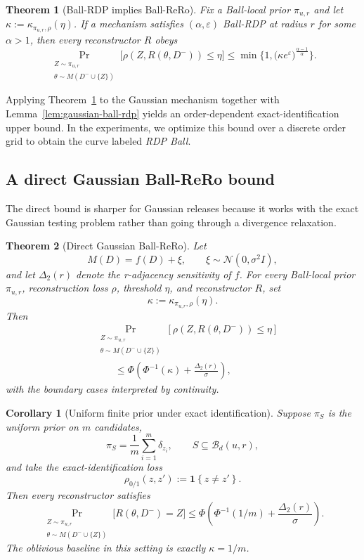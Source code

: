 \documentclass[conference,compsoc]{IEEEtran}
\newtheorem{theorem}{Theorem}
\newtheorem{corollary}{Corollary}
\newcommand{\ind}[1]{\mathbf{1}\!\left\{#1\right\}}
\newcommand{\ball}[2]{\mathcal{B}_{#1}(#2)}
\begin{document}
\begin{theorem}[Ball-RDP implies Ball-ReRo]
\label{thm:ball-rdp-rero}
Fix a Ball-local prior $\pi_{u,r}$ and let $\kappa:=\kappa_{\pi_{u,r},\rho}(\eta)$. If a mechanism satisfies $(\alpha,\varepsilon)$ Ball-RDP at radius $r$ for some $\alpha>1$, then every reconstructor $R$ obeys
\[
\Pr_{\substack{Z\sim\pi_{u,r}\\
\theta\sim M(D^-\cup\{Z\})}}
\big[\rho(Z,R(\theta,D^-))\le \eta\big]
\le
\min\Big\{1,\big(\kappa e^{\varepsilon}\big)^{\frac{\alpha-1}{\alpha}}\Big\}.
\]
\end{theorem}

Applying Theorem~\ref{thm:ball-rdp-rero} to the Gaussian mechanism together with Lemma~\ref{lem:gaussian-ball-rdp} yields an order-dependent exact-identification upper bound. In the experiments, we optimize this bound over a discrete order grid to obtain the curve labeled \emph{RDP Ball}.

\subsection{A direct Gaussian Ball-ReRo bound}

The direct bound is sharper for Gaussian releases because it works with the exact Gaussian testing problem rather than going through a divergence relaxation.

\begin{theorem}[Direct Gaussian Ball-ReRo]
\label{thm:direct-gaussian-rero}
Let
\[
M(D)=f(D)+\xi,
\qquad
\xi\sim\mathcal{N}(0,\sigma^2 I),
\]
and let $\Delta_2(r)$ denote the r-adjacency sensitivity of $f$.
For every Ball-local prior $\pi_{u,r}$, reconstruction loss $\rho$,
threshold $\eta$, and reconstructor $R$, set
\[
\kappa:=\kappa_{\pi_{u,r},\rho}(\eta).
\]
Then
\[
\begin{aligned}
&\Pr_{\substack{Z\sim\pi_{u,r}\\
\theta\sim M(D^-\cup\{Z\})}}
\!\left[\rho(Z,R(\theta,D^-))\le \eta\right] \\
&\qquad\le
\Phi\!\left(
\Phi^{-1}(\kappa)
+
\frac{\Delta_2(r)}{\sigma}
\right),
\end{aligned}
\]
with the boundary cases interpreted by continuity.
\end{theorem}

\begin{corollary}[Uniform finite prior under exact identification]
\label{cor:uniform-finite-prior}
Suppose $\pi_S$ is the uniform prior on $m$ candidates,
\[
\pi_S=\frac{1}{m}\sum_{i=1}^m \delta_{z_i},
\qquad
S\subseteq \ball{d}{u,r},
\]
and take the exact-identification loss
\[
\rho_{0/1}(z,z'):=\ind{z\neq z'}.
\]
Then every reconstructor satisfies
\[
\Pr_{\substack{Z\sim\pi_{u,r}\\
\theta\sim M(D^-\cup\{Z\})}}
\big[R(\theta,D^-)=Z\big]
\le
\Phi\!\left(
\Phi^{-1}(1/m)+\frac{\Delta_2(r)}{\sigma}
\right).
\]
The oblivious baseline in this setting is exactly $\kappa=1/m$.
\end{corollary}
\end{document}
